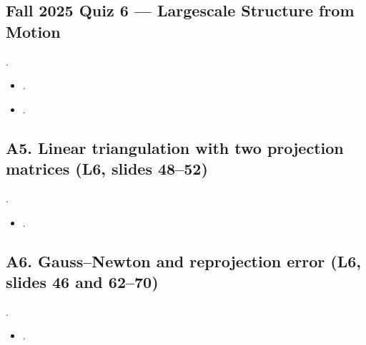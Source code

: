 \documentclass[letterpaper,11pt,english,openany,oneside]{jupyterBook}
\begin{document}
\subsection{Fall 2025 Quiz 6 — Large\sphinxhyphen{}scale Structure from Motion}
\label{\detokenize{reference/quiz-index:fall-2025-quiz-6-large-scale-structure-from-motion}}
\sphinxAtStartPar
{} .
\begin{itemize}
\item {}
\sphinxAtStartPar
{\hyperref[\detokenize{lectures/lecture06/quiz-workbook:quiz-16-q1}]{}}.

\item {}
\sphinxAtStartPar
{\hyperref[\detokenize{lectures/lecture06/quiz-workbook:quiz-16-q2}]{}}.

\end{itemize}


\subsection{A5. Linear triangulation with two projection matrices (L6, slides 48–52)}
\label{\detokenize{reference/quiz-index:a5-linear-triangulation-with-two-projection-matrices-l6-slides-4852}}
\sphinxAtStartPar
{} . 
\begin{itemize}
\item {}
\sphinxAtStartPar
{\hyperref[\detokenize{lectures/lecture06/quiz-workbook:quiz-a5-q1}]{}}.

\end{itemize}


\subsection{A6. Gauss–Newton and reprojection error (L6, slides 46 and 62–70)}
\label{\detokenize{reference/quiz-index:a6-gaussnewton-and-reprojection-error-l6-slides-46-and-6270}}
\sphinxAtStartPar
{} . 
\begin{itemize}
\item {}
\sphinxAtStartPar
{\hyperref[\detokenize{lectures/lecture06/quiz-workbook:quiz-a6-q1}]{}}.

\end{itemize}
\end{document}
